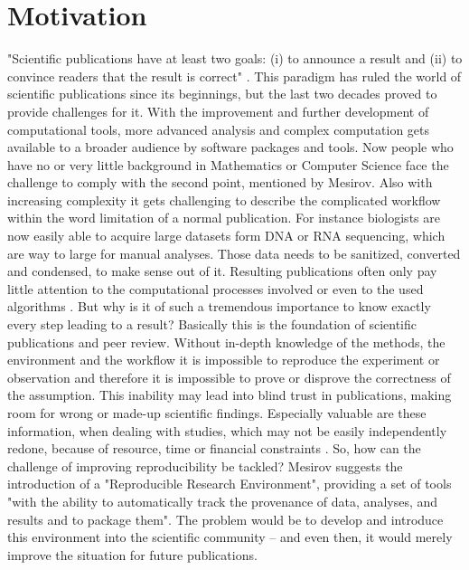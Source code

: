 \section{Motivation}
"Scientific publications have at least two goals: (i) to announce a result and (ii) to convince readers that the result is correct" \citep{Mesirov2010}.
This paradigm has ruled the world of scientific publications since its beginnings, but the last two decades proved to provide challenges for it. With the improvement and further development of computational tools, more advanced analysis and complex computation gets available to a broader audience by software packages and tools. Now people who have no or very little background in Mathematics or Computer Science face the challenge to comply with the second point, mentioned by Mesirov. Also with increasing complexity it gets challenging to describe the complicated workflow within the word limitation of a normal publication.
For instance biologists are now easily able to acquire large datasets form DNA or RNA sequencing, which are way to large for manual analyses. Those data needs to be sanitized, converted and condensed, to make sense out of it. Resulting publications often only pay little attention to the computational processes involved or even to the used algorithms \citep{Peng2011}.
But why is it of such a tremendous importance to know exactly every step leading to a result? Basically this is the foundation of scientific publications and peer review. Without in-depth knowledge of the methods, the environment and the workflow it is impossible to reproduce the experiment or observation and therefore it is impossible to prove or disprove the correctness of the assumption. This inability may lead into blind trust in publications, making room for wrong or made-up scientific findings.
Especially valuable are these information, when dealing with studies, which may not be easily independently redone, because of resource, time or financial constraints \citep{Peng2011}.
So, how can the challenge of improving reproducibility be tackled? Mesirov \citep{Mesirov2010} suggests the introduction of a "Reproducible Research Environment", providing a set of tools "with the ability to automatically track the provenance of data, analyses, and results and to package them".
The problem would be to develop and introduce this environment into the scientific community -- and even then, it would merely improve the situation for future publications.

